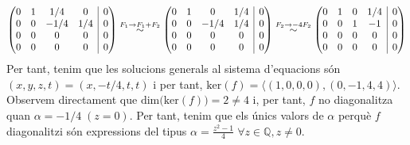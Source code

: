 \documentclass[11pt,a4paper]{article}
\newcommand{\rvline}{\hspace*{-\arraycolsep}\vline\hspace*{-\arraycolsep}}
\begin{document}
\begin{enumerate}
\begin{multline*}
\begin{pmatrix}
                0 & 1 & 1/4 & 0 & \rvline & 0 \\
                0 & 0 & -1/4 & 1/4 & \rvline & 0 \\
                0 & 0 & 0 & 0 & \rvline & 0 \\
                0 & 0 & 0 & 0 & \rvline & 0
            \end{pmatrix}\stackrel{F_1\rightarrow F_1+F_2}{\sim}\begin{pmatrix}
                0 & 1 & 0 & 1/4 & \rvline & 0 \\
                0 & 0 & -1/4 & 1/4 & \rvline & 0 \\
                0 & 0 & 0 & 0 & \rvline & 0 \\
                0 & 0 & 0 & 0 & \rvline & 0
            \end{pmatrix}\stackrel{F_2\rightarrow -4F_2}{\sim}\begin{pmatrix}
                0 & 1 & 0 & 1/4 & \rvline & 0 \\
                0 & 0 & 1 & -1 & \rvline & 0 \\
                0 & 0 & 0 & 0 & \rvline & 0 \\
                0 & 0 & 0 & 0 & \rvline & 0
            \end{pmatrix}
        \end{multline*}
        Per tant, tenim que les solucions generals al sistema d'equacions són $(x,y,z,t)=(x,-t/4,t,t)$ i per tant, $\text{ker}(f)=\langle(1,0,0,0),(0,-1,4,4)\rangle$. Observem directament que $\text{dim(ker}(f))=2\ne 4$ i, per tant, $f$ no diagonalitza quan $\alpha=-1/4\;(z=0)$. Per tant, tenim que els únics valors de $\alpha$ perquè $f$ diagonalitzi són expressions del tipus $\alpha=\frac{z^2-1}{4}\;\forall z\in\mathbb{Q},z\ne 0$.
\end{enumerate}
\end{document}
